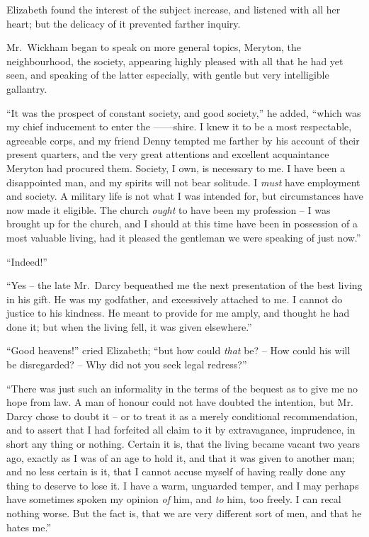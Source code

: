 Elizabeth found the interest of the subject increase, and
listened with all her heart; but the delicacy of it prevented
farther inquiry.

Mr.\ Wickham began to speak on more general topics,
Meryton, the neighbourhood, the society, appearing highly
pleased with all that he had yet seen, and speaking of the
latter especially, with gentle but very intelligible gallantry.

“It was the prospect of constant society, and good
society,” he added, “which was my chief inducement to
enter the ------shire. I knew it to be a most respectable,
agreeable corps, and my friend Denny tempted me farther
by his account of their present quarters, and the very great
attentions and excellent acquaintance Meryton had procured
them. Society, I own, is necessary to me. I have
been a disappointed man, and my spirits will not bear
solitude. I \textit{must} have employment and society. A
military life is not what I was intended for, but circumstances
have now made it eligible. The church \textit{ought} to
have been my profession -- I was brought up for the church,
and I should at this time have been in possession of a most
valuable living, had it pleased the gentleman we were
speaking of just now.”

“Indeed!”

“Yes -- the late Mr.\ Darcy bequeathed me the next
presentation of the best living in his gift. He was my
godfather, and excessively attached to me. I cannot do
justice to his kindness. He meant to provide for me
amply, and thought he had done it; but when the living
fell, it was given elsewhere.”

“Good heavens!” cried Elizabeth; “but how could
\textit{that} be? -- How could his will be disregarded? -- Why did
not you seek legal redress?”

“There was just such an informality in the terms of
the bequest as to give me no hope from law. A man of
honour could not have doubted the intention, but Mr.\ %
Darcy chose to doubt it -- or to treat it as a merely conditional
recommendation, and to assert that I had forfeited
all claim to it by extravagance, imprudence, in short
any thing or nothing. Certain it is, that the living became
vacant two years ago, exactly as I was of an age to hold
it, and that it was given to another man; and no less
certain is it, that I cannot accuse myself of having really
done any thing to deserve to lose it. I have a warm,
unguarded temper, and I may perhaps have sometimes
spoken my opinion \textit{of} him, and \textit{to} him, too freely. I can
recal nothing worse. But the fact is, that we are very
different sort of men, and that he hates me.”

